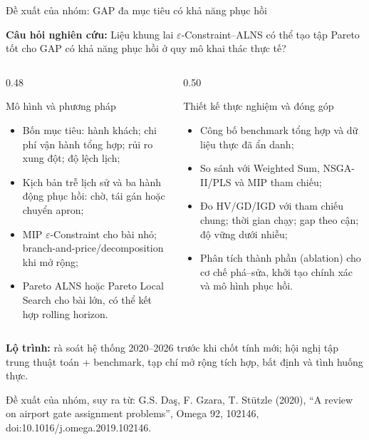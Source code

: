 \documentclass[aspectratio=169,10pt]{beamer}
\begin{document}
\begin{frame}[t]{Đề xuất của nhóm: GAP đa mục tiêu có khả năng phục hồi}

\footnotesize
\textbf{Câu hỏi nghiên cứu:} Liệu khung lai $\varepsilon$-Constraint--ALNS có thể tạo
tập Pareto tốt cho GAP có khả năng phục hồi ở quy mô khai thác thực tế?
\vspace{0.4ex}

\begin{columns}[T,onlytextwidth]
\begin{column}{0.48\textwidth}
\begin{alertblock}{Mô hình và phương pháp}
\begin{itemize}
    \setlength{\itemsep}{1pt}
    \item Bốn mục tiêu: hành khách; chi phí vận hành tổng hợp; rủi ro xung đột; độ lệch lịch;
    \item Kịch bản trễ lịch sử và ba hành động phục hồi: chờ, tái gán hoặc chuyển apron;
    \item MIP $\varepsilon$-Constraint cho bài nhỏ; branch-and-price/decomposition khi mở rộng;
    \item Pareto ALNS hoặc Pareto Local Search cho bài lớn, có thể kết hợp rolling horizon.
\end{itemize}
\end{alertblock}
\end{column}

\begin{column}{0.50\textwidth}
\begin{exampleblock}{Thiết kế thực nghiệm và đóng góp}
\begin{itemize}
    \setlength{\itemsep}{1pt}
    \item Công bố benchmark tổng hợp và dữ liệu thực đã ẩn danh;
    \item So sánh với Weighted Sum, NSGA-II/PLS và MIP tham chiếu;
    \item Đo HV/GD/IGD với tham chiếu chung; thời gian chạy; gap theo cận; độ vững dưới nhiễu;
    \item Phân tích thành phần (ablation) cho cơ chế phá--sửa, khởi tạo chính xác và mô hình phục hồi.
\end{itemize}
\end{exampleblock}
\end{column}
\end{columns}

\vspace{0.2ex}
\textbf{Lộ trình:} rà soát hệ thống 2020--2026 trước khi chốt tính mới;
hội nghị tập trung thuật toán + benchmark, tạp chí mở rộng tích hợp, bất định và tình huống thực.

\vfill
\tiny Đề xuất của nhóm, suy ra từ: G.S. Da\c{s}, F. Gzara, T. St\"utzle (2020),
``A review on airport gate assignment problems'', Omega 92, 102146, doi:10.1016/j.omega.2019.102146.
\end{frame}
\end{document}
